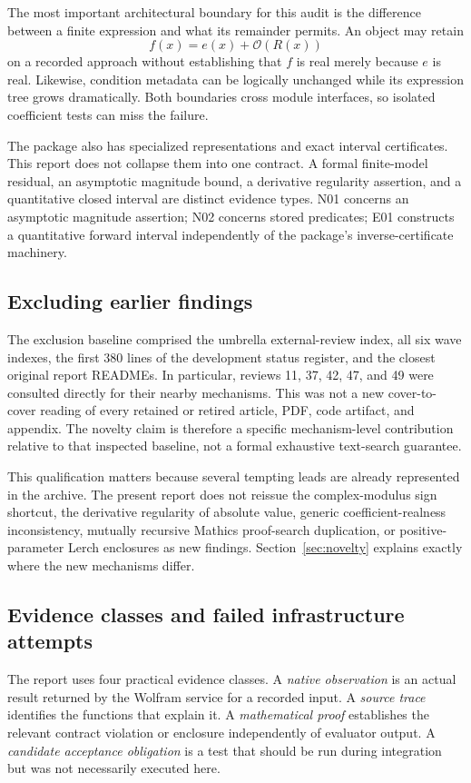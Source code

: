\documentclass[11pt,a4paper]{article}
\newcommand{\OO}{\mathcal O}
\begin{document}
The most important architectural boundary for this audit is the difference between a finite expression and what its remainder permits. An object may retain
\[
 f(x)=e(x)+\OO(R(x))
\]
on a recorded approach without establishing that $f$ is real merely because $e$ is real. Likewise, condition metadata can be logically unchanged while its expression tree grows dramatically. Both boundaries cross module interfaces, so isolated coefficient tests can miss the failure.

The package also has specialized representations and exact interval certificates. This report does not collapse them into one contract. A formal finite-model residual, an asymptotic magnitude bound, a derivative regularity assertion, and a quantitative closed interval are distinct evidence types. N01 concerns an asymptotic magnitude assertion; N02 concerns stored predicates; E01 constructs a quantitative forward interval independently of the package's inverse-certificate machinery.\cite{ops,envelope,certificates}

\subsection{Excluding earlier findings}
The exclusion baseline comprised the umbrella external-review index, all six wave indexes, the first 380 lines of the development status register, and the closest original report READMEs. In particular, reviews 11, 37, 42, 47, and 49 were consulted directly for their nearby mechanisms. This was not a new cover-to-cover reading of every retained or retired article, PDF, code artifact, and appendix. The novelty claim is therefore a specific mechanism-level contribution relative to that inspected baseline, not a formal exhaustive text-search guarantee.\cite{index,status,r11,r37,r42,r47,r49}

This qualification matters because several tempting leads are already represented in the archive. The present report does not reissue the complex-modulus sign shortcut, the derivative regularity of absolute value, generic coefficient-realness inconsistency, mutually recursive Mathics proof-search duplication, or positive-parameter Lerch enclosures as new findings. Section~\ref{sec:novelty} explains exactly where the new mechanisms differ.

\subsection{Evidence classes and failed infrastructure attempts}
The report uses four practical evidence classes. A \emph{native observation} is an actual result returned by the Wolfram service for a recorded input. A \emph{source trace} identifies the functions that explain it. A \emph{mathematical proof} establishes the relevant contract violation or enclosure independently of evaluator output. A \emph{candidate acceptance obligation} is a test that should be run during integration but was not necessarily executed here.
\end{document}
